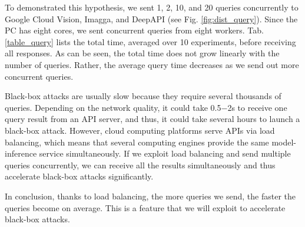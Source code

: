 To demonstrated this hypothesis, we sent 1, 2, 10, and 20 queries concurrently to Google Cloud Vision, Imagga, and DeepAPI (see Fig. \ref{fig:dist_query}). Since the PC has eight cores, we sent concurrent queries from eight workers. Tab. \ref{table_query} lists the total time, averaged over 10 experiments, before receiving all responses. As can be seen, the total time does not grow linearly with the number of queries. Rather, the average query time decreases as we send out more concurrent queries.

Black-box attacks are usually slow because they require several thousands of queries. Depending on the network quality, it could take 0.5$-$2s to receive one query result from an API server, and thus, it could take several hours to launch a black-box attack. However, cloud computing platforms serve APIs via load balancing, which means that several computing engines provide the same model-inference service simultaneously. If we exploit load balancing and send multiple queries concurrently, we can receive all the results simultaneously and thus accelerate black-box attacks significantly. 

In conclusion, thanks to load balancing, the more queries we send, the faster the queries become on average. This is a feature that we will exploit to accelerate black-box attacks. 





